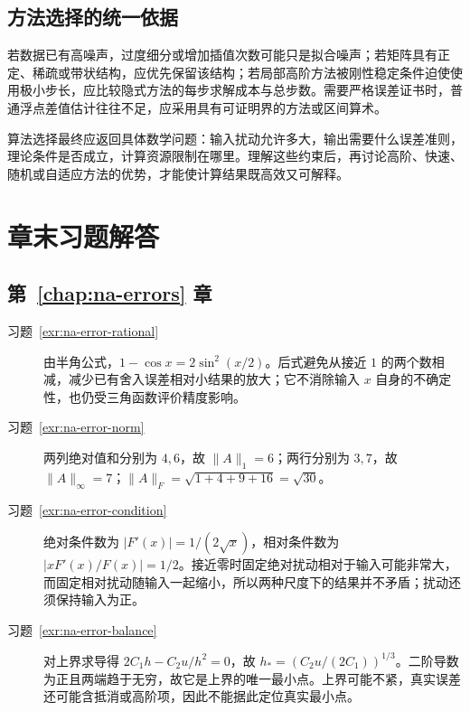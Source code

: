 \documentclass[UTF8,12pt,a4paper,fontset=fandol]{ctexbook}
\begin{document}
\section{方法选择的统一依据}
若数据已有高噪声，过度细分或增加插值次数可能只是拟合噪声；若矩阵具有正定、稀疏或带状结构，应优先保留该结构；若局部高阶方法被刚性稳定条件迫使使用极小步长，应比较隐式方法的每步求解成本与总步数。需要严格误差证书时，普通浮点差值估计往往不足，应采用具有可证明界的方法或区间算术。

算法选择最终应返回具体数学问题：输入扰动允许多大，输出需要什么误差准则，理论条件是否成立，计算资源限制在哪里。理解这些约束后，再讨论高阶、快速、随机或自适应方法的优势，才能使计算结果既高效又可解释。

\appendix
\chapter{章末习题解答}
\label{app:na-solutions}

\section{第~\ref{chap:na-errors} 章}
\begin{description}
\item[习题~\ref{exr:na-error-rational}] 由半角公式，$1-\cos x=2\sin^2(x/2)$。后式避免从接近 $1$ 的两个数相减，减少已有舍入误差相对小结果的放大；它不消除输入 $x$ 自身的不确定性，也仍受三角函数评价精度影响。
\item[习题~\ref{exr:na-error-norm}] 两列绝对值和分别为 $4,6$，故 $\|A\|_1=6$；两行分别为 $3,7$，故 $\|A\|_\infty=7$；$\|A\|_F=\sqrt{1+4+9+16}=\sqrt{30}$。
\item[习题~\ref{exr:na-error-condition}] 绝对条件数为 $|F'(x)|=1/(2\sqrt x)$，相对条件数为 $|xF'(x)/F(x)|=1/2$。接近零时固定绝对扰动相对于输入可能非常大，而固定相对扰动随输入一起缩小，所以两种尺度下的结果并不矛盾；扰动还须保持输入为正。
\item[习题~\ref{exr:na-error-balance}] 对上界求导得 $2C_1h-C_2u/h^2=0$，故 $h_*=(C_2u/(2C_1))^{1/3}$。二阶导数为正且两端趋于无穷，故它是上界的唯一最小点。上界可能不紧，真实误差还可能含抵消或高阶项，因此不能据此定位真实最小点。
\end{description}
\end{document}
